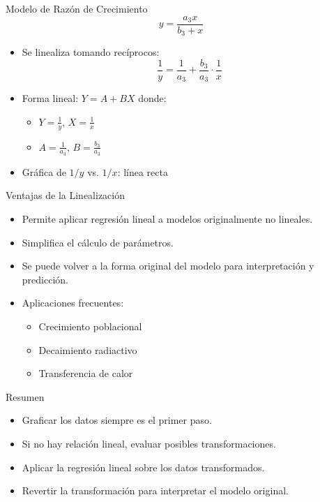 \documentclass[main.tex]{subfiles}
\begin{document}
\begin{frame}{Modelo de Razón de Crecimiento}
  \[
    y = \frac{a_3 x}{b_3 + x}
  \]
  \begin{itemize}
    \item Se linealiza tomando recíprocos:
    \[
      \frac{1}{y} = \frac{1}{a_3} + \frac{b_3}{a_3} \cdot \frac{1}{x}
    \]
    \item Forma lineal: \( Y = A + B X \) donde:
    \begin{itemize}
      \item \( Y = \frac{1}{y} \), \( X = \frac{1}{x} \)
      \item \( A = \frac{1}{a_3} \), \( B = \frac{b_3}{a_3} \)
    \end{itemize}
    \item Gráfica de \( 1/y \) vs. \( 1/x \): línea recta
  \end{itemize}
\end{frame}

\begin{frame}{Ventajas de la Linealización}
  \begin{itemize}
    \item Permite aplicar regresión lineal a modelos originalmente no lineales.
    \item Simplifica el cálculo de parámetros.
    \item Se puede volver a la forma original del modelo para interpretación y predicción.
    \item Aplicaciones frecuentes:
    \begin{itemize}
      \item Crecimiento poblacional
      \item Decaimiento radiactivo
      \item Transferencia de calor
    \end{itemize}
  \end{itemize}
\end{frame}

\begin{frame}{Resumen}
  \begin{itemize}
    \item Graficar los datos siempre es el primer paso.
    \item Si no hay relación lineal, evaluar posibles transformaciones.
    \item Aplicar la regresión lineal sobre los datos transformados.
    \item Revertir la transformación para interpretar el modelo original.
  \end{itemize}
\end{frame}
\end{document}
